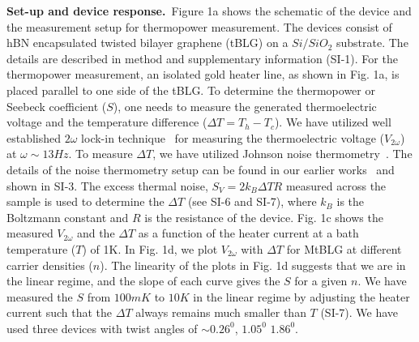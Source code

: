 \documentclass{nature}
\begin{document}
\noindent\textbf{Set-up and device response.}\
Figure 1a shows the schematic of the device and the measurement setup for thermopower measurement. The devices consist of hBN encapsulated twisted bilayer graphene (tBLG) on a $Si/SiO_2$ substrate. %
The details are described in method and supplementary information (SI-1). %
For the thermopower measurement, an isolated gold heater line, as shown in Fig. 1a, is placed parallel to one side of the tBLG. %
To determine the thermopower or Seebeck coefficient ($S$), one needs to measure the generated thermoelectric voltage and the temperature difference ($\Delta T = T_h - T_c$). %
We have utilized well established $2\omega$ lock-in technique~\cite{zuev2009thermoelectric,PhysRevB.80.081413,nam2010thermoelectric,wang2011enhanced,duan2016high,ghahari2016enhanced,mahapatra2020misorientation} for measuring the thermoelectric voltage ($V_{2\omega}$) at $\omega \sim 13 Hz$. %
To measure $\Delta T$, we have utilized Johnson noise thermometry~\cite{Srivastaveaaw5798,fong2012ultrasensitive,crossno2016observation,betz2013supercollision}. %
The details of the noise thermometry setup can be found in our earlier works~\cite{Srivastaveaaw5798,PhysRevLett.126.216803} and shown in SI-3. The excess thermal noise, $S_V=2k_B\Delta TR$ measured across the sample is used to determine the $\Delta T$ (see SI-6 and SI-7), where $k_B$ is the Boltzmann constant and $R$ is the resistance of the device. Fig. 1c shows the measured $V_{2\omega}$ and the $\Delta T$ as a function of the heater current at a bath temperature ($T$) of 1K. In Fig. 1d, we plot $V_{2\omega}$ with $\Delta T$ for MtBLG %
at different carrier densities ($n$). The linearity of the plots in Fig. 1d suggests that we are in the linear regime, and the slope of each curve gives the $S$ for a given $n$. We have measured the $S$ from $100mK$ to $10K$ in the linear regime by adjusting the heater current such that the $\Delta T$ always remains much smaller than $T$ (SI-7). We have used three devices with twist angles of $\sim 0.26^0$, $1.05^0$ $1.86^0$.
\end{document}
